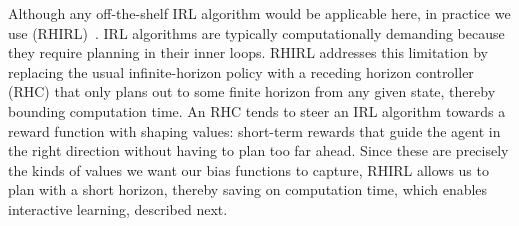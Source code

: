 Although any off-the-shelf IRL algorithm would be applicable here, in
practice we use 
(RHIRL)~\cite{macglashan15b}. IRL algorithms are typically
computationally demanding because they require planning in their inner
loops.
RHIRL addresses this limitation by replacing the usual
infinite-horizon policy with a receding horizon controller (RHC) that
only plans out to some finite horizon from any given state, thereby
bounding computation time. An RHC tends to steer an IRL algorithm
towards a reward function with shaping values: short-term rewards that
guide the agent in the right direction without having to plan too far
ahead. Since these are precisely the kinds of values we want our bias
functions to capture, RHIRL allows us to plan with a short horizon,
thereby saving on computation time, which enables interactive
learning, described next.
